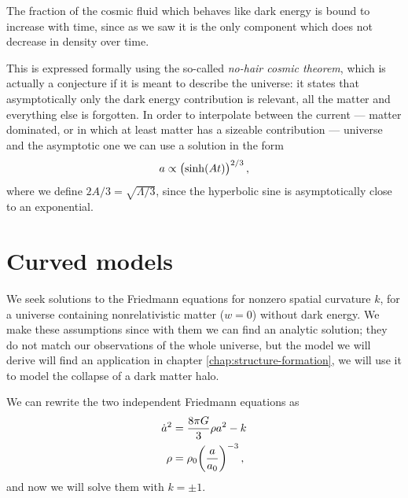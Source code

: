\documentclass[main.tex]{subfiles}
\begin{document}
The fraction of the cosmic fluid which behaves like dark energy is bound to increase with time, since as we saw it is the only component which does not decrease in density over time. 



This is expressed formally using the so-called \emph{no-hair cosmic theorem}, which is actually a conjecture if it is meant to describe the universe: it states that asymptotically only the dark energy contribution is relevant, all the matter and everything else is forgotten. 
In order to interpolate between the current --- matter dominated, or in which at least matter has a sizeable contribution --- universe and the asymptotic one we can use a solution in the form
%
\begin{equation}
  a \propto \qty(\sinh(At))^{2/3}
\,,
\end{equation}
%
where we define \(2A/3 = \sqrt{\Lambda /3} \), since the hyperbolic sine is asymptotically close to an exponential.

\section{Curved models}

We seek solutions to the Friedmann equations for nonzero spatial curvature \(k\), for a universe containing nonrelativistic matter (\(w=0\)) without dark energy.
We make these assumptions since with them we can find an analytic solution; they do not match our observations of the whole universe, but the model we will derive will find an application in chapter \ref{chap:structure-formation}, we will use it to model the collapse of a dark matter halo.

We can rewrite the two independent Friedmann equations as 
%
\begin{align}
  \dot{a}^2 &=  \frac{8 \pi G}{3} \rho a^2 - k  \\
  \rho  &= \rho_0 \qty(\frac{a}{a_0 })^{-3}
\,,
\end{align}
%
and now we will solve them with \(k = \pm 1\).

\medskip
\end{document}
